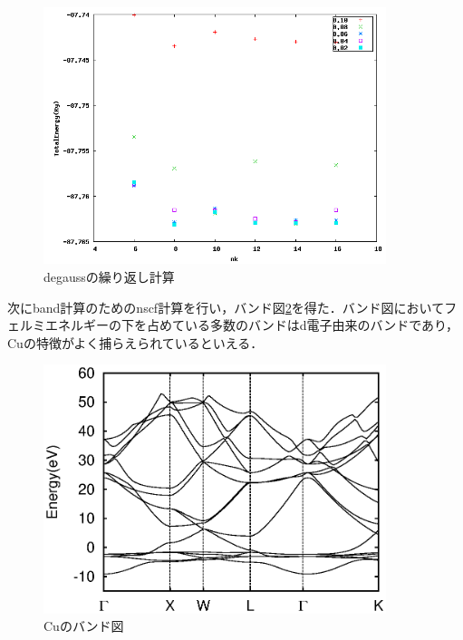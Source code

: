 \documentclass[a4j]{jarticle}
\begin{document}
 \begin{figure}[htb]
  \begin{center}
   \includegraphics[bb=0 0 640 480,width=10cm]{CuTotalEnergy.png}
   \caption{degaussの繰り返し計算}
   \label{052122_19May19}
  \end{center}
 \end{figure}

 次にband計算のためのnscf計算を行い，バンド図\ref{035904_19May19}を得た．バンド図においてフェルミエネルギーの下を占めている多数のバンドはd電子由来のバンドであり，Cuの特徴がよく捕らえられているといえる．
 
 \begin{figure}[htb]
  \begin{center}
   \includegraphics[width=10cm]{Cu.bands.eps}
   \caption{Cuのバンド図}
   \label{035904_19May19}
   \end{center}
 \end{figure}
\end{document}
